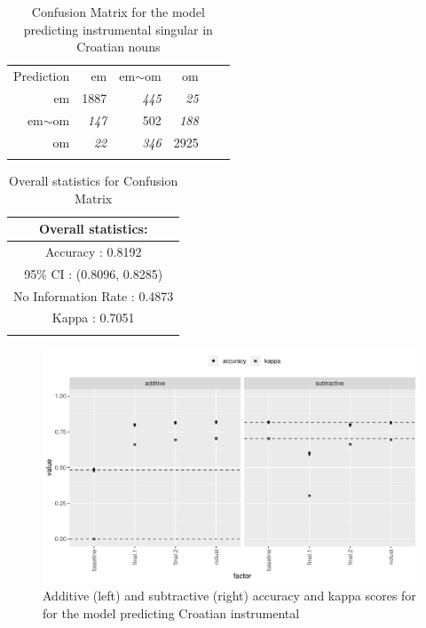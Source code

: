 \begin{table}
  \centering
  \begin{tabular}{rrrrrr}
    \lsptoprule
    \multicolumn{4}{c}{Reference}                           \\
    \midrule
    Prediction & em           & em$\sim$om   & om           \\
    em         & 1887         & \emph{445} & \emph{25}  \\
    em$\sim$om & \emph{147} & 502          & \emph{188} \\
    om         & \emph{22}  & \emph{346} & 2925         \\
    \lspbottomrule
  \end{tabular}
  \caption{Confusion Matrix for the model predicting instrumental singular in Croatian nouns}\label{tab:ins-cro}
\end{table}

\begin{table}
  \centering
  \begin{tabular}{c}
    \lsptoprule
    Overall statistics:          \\
    \midrule
    Accuracy : 0.8192            \\
    95\% CI : (0.8096, 0.8285)   \\
    No Information Rate : 0.4873 \\
    Kappa : 0.7051               \\
    \lspbottomrule
  \end{tabular}
  \caption{Overall statistics for Confusion Matrix }\label{tab:ins-cro-stats}
\end{table}

\begin{figure}
  \centering
  \includegraphics[width=1.0\textwidth]{./figures/croatian/factimp-plot.pdf}
    \caption{Additive (left) and subtractive (right) accuracy and kappa scores for for the model predicting Croatian instrumental}\label{fig:factimp-plot-croatian}
\end{figure}

